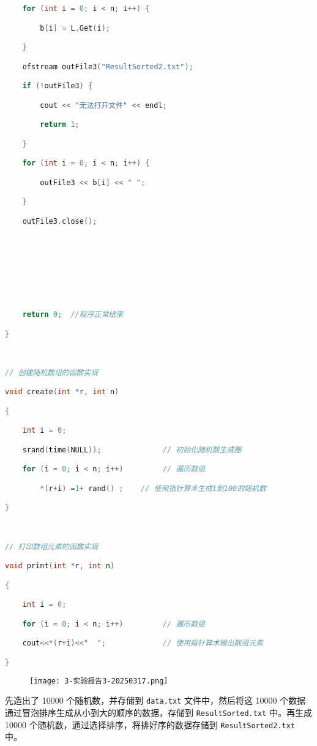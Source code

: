 \begin{lstlisting}[language=C++]
    for (int i = 0; i < n; i++) {

        b[i] = L.Get(i);

    }

    ofstream outFile3("ResultSorted2.txt");

    if (!outFile3) {

        cout << "无法打开文件" << endl;

        return 1;

    }

    for (int i = 0; i < n; i++) {

        outFile3 << b[i] << " ";

    }

    outFile3.close();

  
  
  
  
  
  
  

    return 0;  //程序正常结束

}

  

// 创建随机数组的函数实现

void create(int *r, int n)

{

    int i = 0;

    srand(time(NULL));              // 初始化随机数生成器

    for (i = 0; i < n; i++)         // 遍历数组

        *(r+i) =1+ rand() ;    // 使用指针算术生成1到100的随机数

}

  

// 打印数组元素的函数实现

void print(int *r, int n)

{

    int i = 0;

    for (i = 0; i < n; i++)         // 遍历数组

    cout<<*(r+i)<<"  ";             // 使用指针算术输出数组元素

}
\end{lstlisting}
\begin{figure}[H]
\centering
\texttt{[image: 3-实验报告3-20250317.png]}
\label{}
\end{figure}

先造出了 10000 个随机数，并存储到 \lstinline{data.txt} 文件中，然后将这 10000 个数据通过冒泡排序生成从小到大的顺序的数据，存储到 \lstinline{ResultSorted.txt} 中。再生成 10000 个随机数，通过选择排序，将排好序的数据存储到 \lstinline{ResultSorted2.txt} 中。
